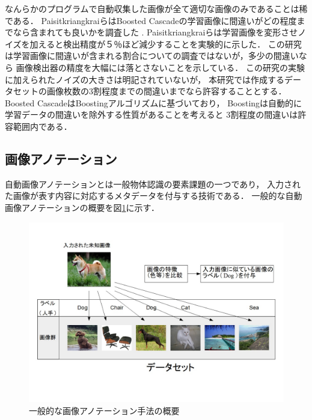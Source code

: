 \documentclass{deimj}
\begin{document}
なんらかのプログラムで自動収集した画像が全て適切な画像のみであることは稀である．
PaisitkriangkraiらはBoosted Cascadeの学習画像に間違いがどの程度までなら含まれても良いかを調査した
\cite{DBLP:journals/corr/abs-1009-5758}
.
Paisitkriangkraiらは学習画像を変形させノイズを加えると検出精度が５％ほど減少することを実験的に示した．
この研究は学習画像に間違いが含まれる割合についての調査ではないが，多少の間違いなら
画像検出器の精度を大幅には落とさないことを示している．
この研究の実験に加えられたノイズの大きさは明記されていないが，
本研究では作成するデータセットの画像枚数の3割程度までの間違いまでなら許容することとする．
Boosted CascadeはBoostingアルゴリズムに基づいており，
Boostingは自動的に学習データの間違いを除外する性質があることを考えると
3割程度の間違いは許容範囲内である．

\subsection{画像アノテーション}

自動画像アノテーションとは一般物体認識の要素課題の一つであり，
入力された画像が表す内容に対応するメタデータを付与する技術である．
一般的な自動画像アノテーションの概要を図\ref{fig:abst}に示す．

\begin{figure}[tb]
 \begin{center}
  \includegraphics[scale=0.28]{gaiyou.jpg}
 \end{center}
 \caption{一般的な画像アノテーション手法の概要}
 \label{fig:abst}
\end{figure}
\end{document}
